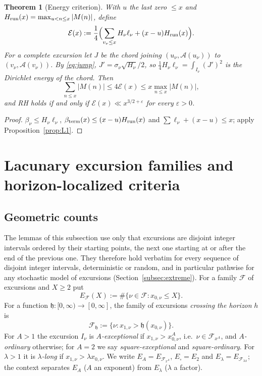 \documentclass[11pt]{amsart}
\numberwithin{equation}{section}
\theoremstyle{plain}
\newtheorem{theorem}{Theorem}[section]
\theoremstyle{definition}
\theoremstyle{remark}
\newcommand{\Anet}{\mathcal{A}}
\newcommand{\eps}{\varepsilon}
\newcommand{\En}{\mathcal{E}}
\newcommand{\F}{\mathcal{F}}
\begin{document}
\begin{theorem}[Energy criterion]
\label{thm:energy}
With $u$ the last zero $\le x$ and $H_{\rm run}(x)=\max_{u<n\le x}|M(n)|$,
define
\begin{equation}
\label{eq:energy_def}
  \En(x):=\frac14\Bigl(\sum_{v_\nu\le x}H_\nu\ell_\nu+(x-u)H_{\rm run}(x)\Bigr).
\end{equation}
For a complete excursion let $J$ be the chord joining
$(u_\nu,\Anet(u_\nu))$ to $(v_\nu,\Anet(v_\nu))$. By \eqref{eq:jump},
$J'=\sigma_\nu\sqrt{H_\nu}/2$, so $\tfrac14H_\nu\ell_\nu=\int_{I_\nu}(J')^2$
is the Dirichlet energy of the chord. Then
\begin{equation}
\label{eq:energy_sandwich}
  \sum_{n\le x}|M(n)|\le4\En(x)\le x\max_{n\le x}|M(n)|,
\end{equation}
and RH holds if and only if $\En(x)\ll x^{3/2+\eps}$ for every $\eps>0$.
\end{theorem}

\begin{proof}
$\beta_\nu\le H_\nu\ell_\nu$, $\beta_{\rm term}(x)\le(x-u)H_{\rm run}(x)$ and
$\sum\ell_\nu+(x-u)\le x$; apply Proposition~\ref{prop:L1}.
\end{proof}

\section{Lacunary excursion families and horizon-localized criteria}
\label{sec:lacunary}

\subsection{Geometric counts}
\label{subsec:geometric}

The lemmas of this subsection use only that excursions are disjoint integer
intervals ordered by their starting points, the next one starting at or
after the end of the previous one. They therefore hold verbatim for every
sequence of disjoint integer intervals, deterministic or random, and in
particular pathwise for any stochastic model of excursions
(Section~\ref{subsec:extreme}). For a family $\F$ of excursions and $X\ge2$
put
\[
E_\F(X):=\#\{\nu\in\F:x_{0,\nu}\le X\}.
\]
For a function $\mathfrak h:[0,\infty)\to[0,\infty]$, the family of
excursions \emph{crossing the horizon} $h$ is
\[
\F_{\mathfrak h}:=\{\nu:x_{1,\nu}>\mathfrak h(x_{0,\nu})\}.
\]
For $A>1$ the excursion $I_\nu$ is \emph{$A$-exceptional} if
$x_{1,\nu}>x_{0,\nu}^A$, i.e.\ $\nu\in\F_{x^A}$, and \emph{$A$-ordinary}
otherwise; for $A=2$ we say \emph{square-exceptional} and
\emph{square-ordinary}. For $\lambda>1$ it is \emph{$\lambda$-long} if
$x_{1,\nu}>\lambda x_{0,\nu}$. We write $E_A=E_{\F_{x^A}}$,
$E_\square=E_2$ and $E_\lambda=E_{\F_{\lambda x}}$; the context separates
$E_A$ ($A$ an exponent) from $E_\lambda$ ($\lambda$ a factor).
\end{document}
